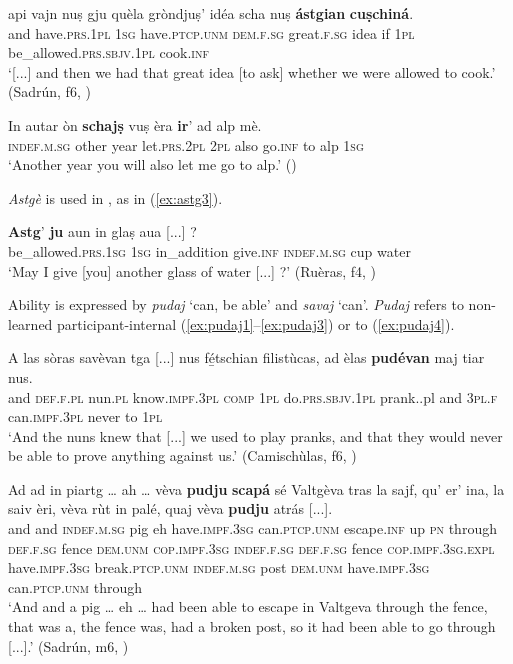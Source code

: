\ea
\label{ex:astg1}
\gll[...] api vajn nuṣ gju quèla gròndjuṣ’ idéa scha nuṣ \textbf{ástgian} \textbf{cuṣchiná}.\\
{} and have.\textsc{prs.1pl} \textsc{1sg} have.\textsc{ptcp.unm} \textsc{dem.f.sg} great.\textsc{f.sg} idea if \textsc{1pl} be\_allowed.\textsc{prs.sbjv.1pl} cook.\textsc{inf}\\
\glt `[...] and then we had that great idea [to ask] whether we were allowed to cook.' (Sadrún, f6, )
\z

\ea
\label{ex:astg2}
\gll  In autar òn \textbf{schajṣ} vuṣ èra \textbf{ir}' ad alp mè.\\
\textsc{indef.m.sg} other year let.\textsc{prs.2pl} \textsc{2pl} also go.\textsc{inf} to alp \textsc{1sg}\\
\glt `Another year you will also let me go to alp.' (\citealt[85]{Gadola1935})
\z

\textit{Astgè} is used in , as in  (\ref{ex:astg3}).

\ea
\label{ex:astg3}
	\gll  \textbf{Astg}’ \textbf{ju} aun  in glaṣ aua [...] ?\\
be\_allowed.\textsc{prs.1sg} \textsc{1sg} in\_addition give.\textsc{inf} \textsc{indef.m.sg} cup water\\
\glt `May I give [you] another glass of water [...] ?' (Ruèras, f4, )
\z

Ability is expressed by \textit{pudaj} `can, be able' and \textit{savaj} `can'. \textit{Pudaj} refers to non-learned participant-internal  (\ref{ex:pudaj1}--\ref{ex:pudaj3}) or to  (\ref{ex:pudaj4}).

\ea
\label{ex:pudaj1}
\gll    A las sòras savèvan tga [...] nus fé̱tschian filistùcas, ad èlas \textbf{pudévan} maj tiar nus.\\
and \textsc{def.f.pl} nun.\textsc{pl} know.\textsc{impf.3pl} \textsc{comp} {} \textsc{1pl} do.\textsc{prs.sbjv.1pl} prank.\textsc.{pl} and \textsc{3pl.f} can.\textsc{impf.3pl} never to \textsc{1pl}\\
\glt `And the nuns knew that [...] we used to play pranks, and that they would never be able to prove anything against us.' (Camischùlas, f6, )
\z

\ea
\label{ex:pudaj2}
\gll    Ad ad in piartg … ah … vèva \textbf{pudju} \textbf{scapá} sé Valtgèva tras la sajf, qu’ er’ ina, la saiv èri, vèva rùt in palé, quaj vèva \textbf{pudju} atrás [...].\\
and and \textsc{indef.m.sg} pig {} eh {}  have.\textsc{impf.3sg} can.\textsc{ptcp.unm} escape.\textsc{inf} up \textsc{pn} through \textsc{def.f.sg} fence  \textsc{dem.unm} \textsc{cop.impf.3sg}  \textsc{indef.f.sg} \textsc{def.f.sg} fence \textsc{cop.impf.3sg.expl} have.\textsc{impf.3sg} break.\textsc{ptcp.unm}  \textsc{indef.m.sg} post \textsc{dem.unm}  have.\textsc{impf.3sg} can.\textsc{ptcp.unm} through \\
\glt `And and a pig … eh … had been able to escape in Valtgeva through the fence, that was a, the fence was, had a broken post, so it had been able to go through [...].' (Sadrún, m6, )
\z

